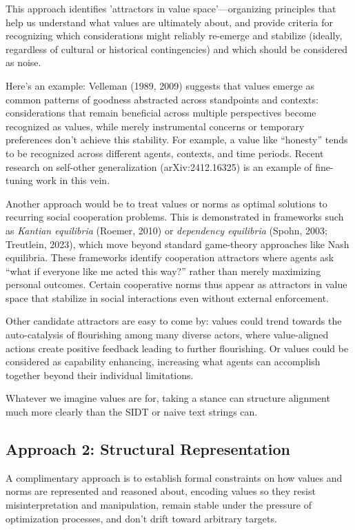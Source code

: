 This approach identifies 'attractors in value space'—organizing principles that help us understand what values are ultimately about, and provide criteria for recognizing which considerations might reliably re-emerge and stabilize (ideally, regardless of cultural or historical contingencies) and which should be considered as noise.

Here's an example: Velleman (1989, 2009) suggests that values emerge as common patterns of goodness abstracted across standpoints and contexts: considerations that remain beneficial across multiple perspectives become recognized as values, while merely instrumental concerns or temporary preferences don't achieve this stability. For example, a value like ``honesty'' tends to be recognized across different agents, contexts, and time periods. Recent research on self-other generalization (arXiv:2412.16325) is an example of fine-tuning work in this vein.

Another approach would be to treat values or norms as optimal solutions to recurring social cooperation problems. This is demonstrated in frameworks such as \textit{Kantian equilibria} (Roemer, 2010) or \textit{dependency equilibria} (Spohn, 2003; Treutlein, 2023), which move beyond standard game-theory approaches like Nash equilibria. These frameworks identify cooperation attractors where agents ask ``what if everyone like me acted this way?'' rather than merely maximizing personal outcomes. Certain cooperative norms thus appear as attractors in value space that stabilize in social interactions even without external enforcement.

Other candidate attractors are easy to come by: values could trend towards the auto-catalysis of flourishing among many diverse actors, where value-aligned actions create positive feedback leading to further flourishing. Or values could be considered as capability enhancing, increasing what agents can accomplish together beyond their individual limitations.

Whatever we imagine values are for, taking a stance can structure alignment much more clearly than the SIDT or naive text strings can.

\subsection{Approach 2: Structural Representation}

A complimentary approach is to establish formal constraints on how values and norms are represented and reasoned about, encoding values so they resist misinterpretation and manipulation, remain stable under the pressure of optimization processes, and don't drift toward arbitrary targets.

